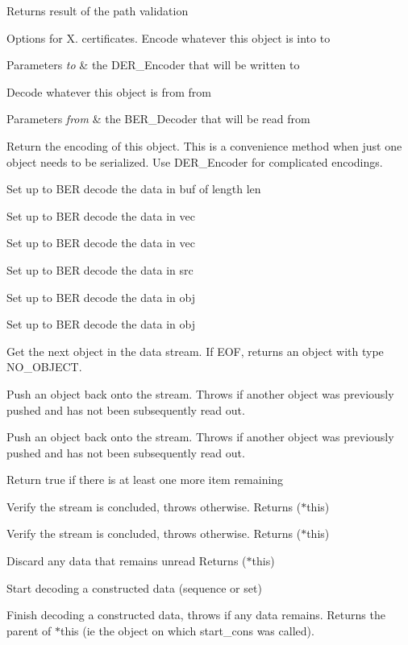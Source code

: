 \begin{DoxyReturn}{Returns}
result of the path validation
\end{DoxyReturn}
Options for X. certificates. Encode whatever this object is into to 
\begin{DoxyParams}{Parameters}
{\em to} & the D\+E\+R\+\_\+\+Encoder that will be written to\\
\hline
\end{DoxyParams}
Decode whatever this object is from from 
\begin{DoxyParams}{Parameters}
{\em from} & the B\+E\+R\+\_\+\+Decoder that will be read from\\
\hline
\end{DoxyParams}
Return the encoding of this object. This is a convenience method when just one object needs to be serialized. Use D\+E\+R\+\_\+\+Encoder for complicated encodings.

Set up to B\+ER decode the data in buf of length len

Set up to B\+ER decode the data in vec

Set up to B\+ER decode the data in vec

Set up to B\+ER decode the data in src

Set up to B\+ER decode the data in obj

Set up to B\+ER decode the data in obj

Get the next object in the data stream. If E\+OF, returns an object with type N\+O\+\_\+\+O\+B\+J\+E\+CT.

Push an object back onto the stream. Throws if another object was previously pushed and has not been subsequently read out.

Push an object back onto the stream. Throws if another object was previously pushed and has not been subsequently read out.

Return true if there is at least one more item remaining

Verify the stream is concluded, throws otherwise. Returns ($\ast$this)

Verify the stream is concluded, throws otherwise. Returns ($\ast$this)

Discard any data that remains unread Returns ($\ast$this)

Start decoding a constructed data (sequence or set)

Finish decoding a constructed data, throws if any data remains. Returns the parent of $\ast$this (ie the object on which start\+\_\+cons was called).


